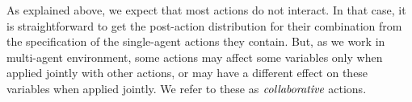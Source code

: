 \documentclass[letterpaper]{article} %
\newcommand{\ronen}[1]{\textbf{[\color{blue}RONEN:#1]}}
\begin{document}
As explained above, we expect that most actions do not interact. In that case, it is straightforward to get the post-action distribution for their combination from the specification of the single-agent actions they contain. But, as we work in multi-agent environment, some actions may affect some variables only when applied jointly with other actions, or may have a different effect on these variables when applied jointly.
We refer to these as $\emph{collaborative}$ actions. 

\end{document}
